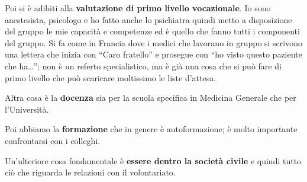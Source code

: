 \documentclass[]{article}
\begin{document}
Poi si è adibiti alla \textbf{valutazione di primo livello vocazionale}.
Io sono anestesista, psicologo e ho fatto anche lo psichiatra quindi
metto a disposizione del gruppo le mie capacità e competenze ed è quello
che fanno tutti i componenti del gruppo. Si fa come in Francia dove i
medici che lavorano in gruppo si scrivono una lettera che inizia con
``Caro fratello'' e prosegue con ``ho visto questo paziente che
ha\ldots{}''; non è un referto specialistico, ma è già una cosa che si
può fare di primo livello che può scaricare moltissimo le liste
d'attesa.

Altra cosa è la \textbf{docenza} sia per la scuola specifica in Medicina
Generale che per l'Università.

Poi abbiamo la \textbf{formazione} che in genere è autoformazione; è
molto importante confrontarsi con i colleghi.

Un'ulteriore cosa fondamentale è \textbf{essere dentro la società
civile} e quindi tutto ciò che riguarda le relazioni con il
volontariato.
\end{document}
